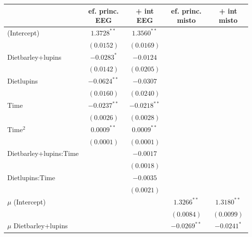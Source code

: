 \documentclass[
  11pt,
]{article}
\begin{document}
\begin{table}
\begin{center}
\begin{tabular}{l c c c c}
\hline
 & ef. princ. EEG &  + int EEG & ef. princ. misto &  + int misto \\
\hline
(Intercept)                  & $1.3728^{**}$  & $1.3560^{**}$  &                &                \\
                             & $(0.0152)$     & $(0.0169)$     &                &                \\
Dietbarley+lupins            & $-0.0283^{*}$  & $-0.0124$      &                &                \\
                             & $(0.0142)$     & $(0.0205)$     &                &                \\
Dietlupins                   & $-0.0624^{**}$ & $-0.0307$      &                &                \\
                             & $(0.0160)$     & $(0.0240)$     &                &                \\
Time                         & $-0.0237^{**}$ & $-0.0218^{**}$ &                &                \\
                             & $(0.0026)$     & $(0.0028)$     &                &                \\
Time$^2$                     & $0.0009^{**}$  & $0.0009^{**}$  &                &                \\
                             & $(0.0001)$     & $(0.0001)$     &                &                \\
Dietbarley+lupins:Time       &                & $-0.0017$      &                &                \\
                             &                & $(0.0018)$     &                &                \\
Dietlupins:Time              &                & $-0.0035$      &                &                \\
                             &                & $(0.0021)$     &                &                \\
$\mu$ (Intercept)            &                &                & $1.3266^{**}$  & $1.3180^{**}$  \\
                             &                &                & $(0.0084)$     & $(0.0099)$     \\
$\mu$ Dietbarley+lupins      &                &                & $-0.0269^{**}$ & $-0.0241^{*}$  \\

\end{tabular}
\end{center}
\end{table}
\end{document}
